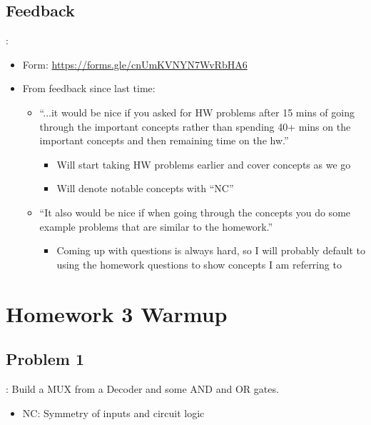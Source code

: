 \documentclass{../slides}
\begin{document}
\subsection{Feedback}
\begin{frame}{\secname: \subsecname}
    \begin{itemize}
        \item Form: \url{https://forms.gle/cnUmKVNYN7WvRbHA6}
        \item From feedback since last time:
        \begin{itemize}
            \item \enquote{...it would be nice if you asked for HW problems after 15 mins of going through the important concepts rather than spending 40+ mins on the important concepts and then remaining time on the hw.}
            \begin{itemize}
                \item Will start taking HW problems earlier and cover concepts as we go
                \item Will denote notable concepts with \enquote{NC}
            \end{itemize}
            \item \enquote{It also would be nice if when going through the concepts you do some example problems that are similar to the homework.}
            \begin{itemize}
                \item Coming up with questions is always hard, so I will probably default to using the homework questions to show concepts I am referring to
            \end{itemize}
        \end{itemize}
    \end{itemize}
\end{frame}

\section{Homework 3 Warmup}
\subsection{Problem 1}
\begin{frame}{\secname: \subsecname}
    Build a MUX from a Decoder and some AND and OR gates.
    \begin{itemize}
        \item NC: Symmetry of inputs and circuit logic
    \end{itemize}
\end{frame}
\end{document}
